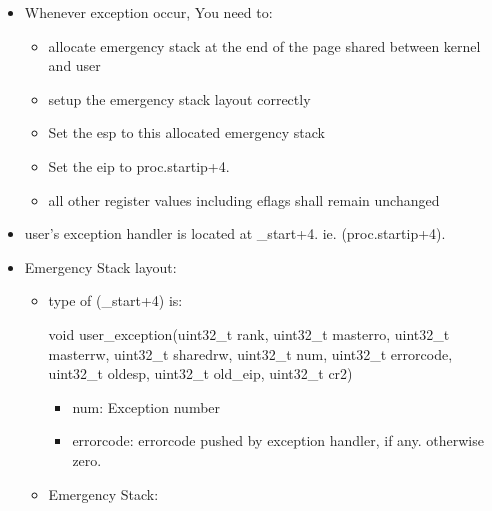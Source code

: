 \documentclass[]{book}
\newenvironment{Shaded}{}{}
\newcommand{\DataTypeTok}[1]{\textcolor[rgb]{0.50,0.00,0.00}{{#1}}}
\newcommand{\NormalTok}[1]{{#1}}
\begin{document}
\begin{itemize}
\itemsep1pt\parskip0pt
\item
  Whenever exception occur, You need to:

  \begin{itemize}
  \itemsep1pt\parskip0pt
  \item
    allocate emergency stack at the end of the page shared between
    kernel and user
  \item
    setup the emergency stack layout correctly
  \item
    Set the esp to this allocated emergency stack
  \item
    Set the eip to proc.startip+4.
  \item
    all other register values including eflags shall remain unchanged
  \end{itemize}
\item
  user's exception handler is located at \_start+4. ie.
  (proc.startip+4).
\item
  Emergency Stack layout:

  \begin{itemize}
  \item
    type of (\_start+4) is:

\begin{Shaded}
\begin{Highlighting}[]
\DataTypeTok{void} \NormalTok{user_exception(}\DataTypeTok{uint32_t} \NormalTok{rank, }\DataTypeTok{uint32_t} \NormalTok{masterro, }\DataTypeTok{uint32_t} \NormalTok{masterrw, }\DataTypeTok{uint32_t} \NormalTok{sharedrw, }\DataTypeTok{uint32_t} \NormalTok{num, }\DataTypeTok{uint32_t} \NormalTok{errorcode, }\DataTypeTok{uint32_t} \NormalTok{oldesp, }\DataTypeTok{uint32_t} \NormalTok{old_eip, }\DataTypeTok{uint32_t} \NormalTok{cr2)}
\end{Highlighting}
\end{Shaded}

    \begin{itemize}
    \itemsep1pt\parskip0pt
    \item
      num: Exception number
    \item
      errorcode: errorcode pushed by exception handler, if any.
      otherwise zero.
    \end{itemize}
  \item
    Emergency Stack:


\end{itemize}
\end{itemize}
\end{document}
